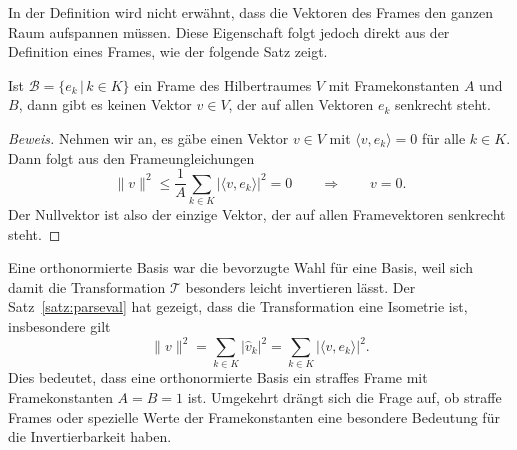 In der Definition wird nicht erwähnt, dass die Vektoren des Frames den
ganzen Raum aufspannen müssen.
Diese Eigenschaft folgt jedoch direkt aus der Definition eines Frames,
wie der folgende Satz zeigt.

\begin{satz}
\label{geometrie:frame:erzeugt}
Ist $\mathcal{B}=\{ e_k\,|\, k\in K\}$ ein Frame des Hilbertraumes $V$
mit Framekonstanten $A$ und $B$, dann gibt es keinen Vektor $v\in V$,
der auf allen Vektoren $e_k$ senkrecht steht.
\end{satz}

\begin{proof}[Beweis]
Nehmen wir an, es gäbe einen Vektor $v\in V$ mit $\langle v,e_k\rangle=0$
für alle $k\in K$.
Dann folgt aus den Frameungleichungen
\[
\| v \|^2 \le \frac1{A} \sum_{k\in K} |\langle v,e_k\rangle|^2 = 0
\qquad\Rightarrow\qquad
v=0.
\]
Der Nullvektor ist also der einzige Vektor, der auf allen Framevektoren
senkrecht steht.
\end{proof}

Eine orthonormierte Basis war die bevorzugte Wahl für eine Basis, weil
sich damit die Transformation $\mathcal{T}$ besonders leicht invertieren
lässt.
Der Satz~\ref{satz:parseval} hat gezeigt, dass die Transformation %
eine Isometrie ist, insbesondere gilt
\[
\|v\|^2
=
\sum_{k\in K} |\hat{v}_k|^2
=
\sum_{k\in K} |\langle v,e_k\rangle|^2.
\]
Dies bedeutet, dass eine orthonormierte Basis ein straffes Frame mit
Framekonstanten $A=B=1$ ist.
Umgekehrt drängt sich die Frage auf, ob straffe Frames oder spezielle
Werte der Framekonstanten eine besondere Bedeutung für die Invertierbarkeit
haben.

